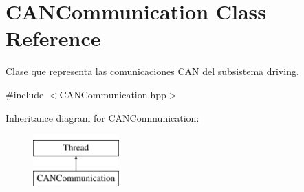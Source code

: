 \hypertarget{class_c_a_n_communication}{\section{\-C\-A\-N\-Communication \-Class \-Reference}
\label{class_c_a_n_communication}
}


\-Clase que representa las comunicaciones \-C\-A\-N del subsistema driving.  




{\ttfamily \#include $<$\-C\-A\-N\-Communication.\-hpp$>$}

\-Inheritance diagram for \-C\-A\-N\-Communication\-:\begin{figure}[H]
\begin{center}
\leavevmode
\includegraphics[height=2.000000cm]{class_c_a_n_communication}
\end{center}
\end{figure}
